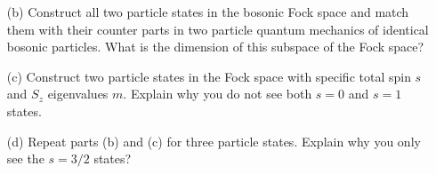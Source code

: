 \begin{homeworkProblem}
\begin{itemize}
\begin{callout}{Solution:}
\begin{enumerate}[(1)]
                        and this seems to check out! (minus a factor of $\hbar$, but perhaps it's that I've copied from a different textbook) It's 11:55 before the due date so I will stop this here, but the other two are the same thing.

                \end{enumerate}

            \end{callout}
        \item[(b)] Construct all two particle states in the bosonic Fock space and match them with their counter parts in two particle quantum mechanics of identical bosonic particles. What is the dimension of this subspace of the Fock space?
        \item[(c)] Construct two particle states in the Fock space with specific total spin $s$ and $S_z$ eigenvalues $m$. Explain why you do not see both $s=0$ and $s=1$ states.
        \item[(d)] Repeat parts (b) and (c) for three particle states. Explain why you only see the $s=3 / 2$ states?
    \end{itemize}
\end{homeworkProblem}

